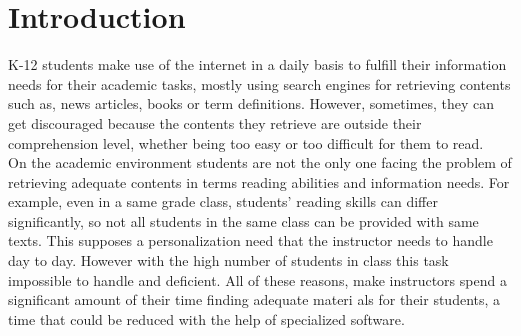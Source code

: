 \documentclass{sig-alternate-05-2015}
\begin{document}
{


%
%

%
%
\printccsdesc



\section{Introduction}

K-12 students make use of the internet in a daily basis to fulfill their information needs for their academic tasks, mostly using search engines for retrieving contents such as, news articles, books or term definitions. However, sometimes, they can get discouraged because the contents they retrieve are outside their comprehension level, whether being too easy or too difficult  for them to read.\\



On the academic environment students are not the only one facing the problem of retrieving adequate contents in terms reading abilities and information needs. For example, even in a same grade class, students' reading skills can differ significantly, so not all students in the same class can be provided with same texts. This supposes a personalization need that the instructor needs to handle day to day. However with the high number of students in class this task impossible to handle and deficient. All of these reasons, make instructors spend a significant amount of their time finding adequate materi als for their students, a time that could be reduced with the help of specialized software.\\


}
\end{document}
